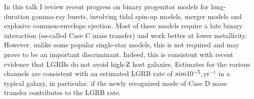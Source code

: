 


\bigskip



\bigskip

\noindent In this talk I review recent progress on binary progenitor models for
long-duration gamma-ray bursts, involving tidal spin-up models, merger
models and explosive common-envelope ejection. Most of these models
require a late binary interaction (so-called Case C mass transfer) and
work better at lower metallicity. However, unlike some popular
single-star models, this is not required and may prove to be an
important discriminant. Indeed, this is
consistent with recent evidence that LGRBs do not avoid high-Z host galaxies.  Estimates for the various channels are consistent with an estimated LGRB rate of $\\sim 10^{-5}\\,$yr$^{-1}$ in
a typical galaxy, in particular, if the newly recognized mode of Case
D mass transfer contributes to the LGRB rate.
